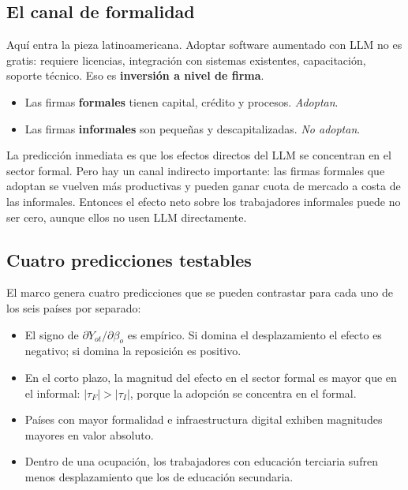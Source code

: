 \documentclass[12pt]{article}
\begin{document}
\subsection{El canal de formalidad}

Aquí entra la pieza latinoamericana. Adoptar software aumentado con LLM no es gratis: requiere licencias, integración con sistemas existentes, capacitación, soporte técnico. Eso es \textbf{inversión a nivel de firma}.

\begin{itemize}
  \item Las firmas \textbf{formales} tienen capital, crédito y procesos. \emph{Adoptan}.
  \item Las firmas \textbf{informales} son pequeñas y descapitalizadas. \emph{No adoptan}.
\end{itemize}

La predicción inmediata es que los efectos directos del LLM se concentran en el sector formal. Pero hay un canal indirecto importante: las firmas formales que adoptan se vuelven más productivas y pueden ganar cuota de mercado a costa de las informales. Entonces el efecto neto sobre los trabajadores informales puede no ser cero, aunque ellos no usen LLM directamente.

\subsection{Cuatro predicciones testables}

El marco genera cuatro predicciones que se pueden contrastar para cada uno de los seis países por separado:

\begin{itemize}
  \item[\textbf{P1.}] El signo de $\partial Y_{ot}/\partial \beta_o$ es empírico. Si domina el desplazamiento el efecto es negativo; si domina la reposición es positivo.
  \item[\textbf{P2.}] En el corto plazo, la magnitud del efecto en el sector formal es mayor que en el informal: $|\tau_F| > |\tau_I|$, porque la adopción se concentra en el formal.
  \item[\textbf{P3.}] Países con mayor formalidad e infraestructura digital exhiben magnitudes mayores en valor absoluto.
  \item[\textbf{P4.}] Dentro de una ocupación, los trabajadores con educación terciaria sufren menos desplazamiento que los de educación secundaria.
\end{itemize}
\end{document}
